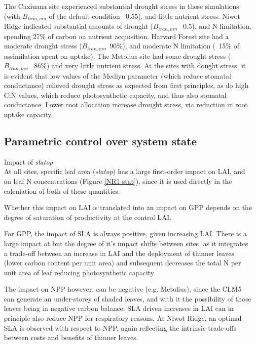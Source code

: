 \documentclass[draft,linenumbers]{agujournal}
\begin{document}
The Caxiuana site experienced substantial drought stress in these simulations (with $B_{tran,mn}$ of the default condition ~0.55), and little nutrient stress. Niwot Ridge indicated substantial amounts of drought ($B_{tran,mn}$ ~0.5), and N limitation, spending 27\% of carbon on nutrient acquisition. Harvard Forest site had a moderate drought stress ($B_{tran,mn}$~90\%), and moderate N limitation (~15\% of assimilation spent on uptake). The Metolius site had some drought stress ($B_{tran,mn}$ ~86\%) and very little nutrient stress.  At the sites with dought stress, it is evident that low values of the Medlyn parameter (which reduce stomatal conductance) relieved drought stress as expected from first principles, as do high C:N values, which reduce photosynthetic capacity, and thus also stomatal conductance. Lower root allocation increase drought stress, via reduction in root uptake capacity. 

\subsection{Parametric control over system state}

Impact of \emph{slatop}\\
At all sites, specific leaf area (\emph{slatop}) has a large first-order impact on LAI,  and on leaf N concentrations (Figure \ref{NR1 stat}), since it is used directly in the calculation of both of these quantities. 

Whether this impact on LAI is translated into an impact on GPP depends on the degree of saturation of productivity at the control LAI. 

For GPP, the impact of SLA is always positive, given increasing LAI. There is a large impact at  but the degree of it's impact shifts between sites, as it integrates a trade-off between an increase in LAI and the deployment of thinner leaves (lower carbon content per unit area) and subsequent decreases the total N per unit area of leaf reducing photosynthetic capacity 

The impact on NPP however, can be negative (e.g. Metolius), since the CLM5 can generate an under-storey of shaded leaves, and with it the possibility of those leaves being in negative carbon balance.  SLA driven increases in LAI can in principle also reduce NPP for respiratory reasons. At Niwot Ridge, an optimal SLA is observed with respect to NPP, again reflecting the intrinsic trade-offs between costs and benefits of thinner leaves. 
\end{document}

